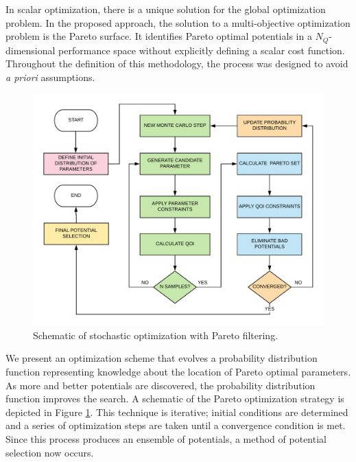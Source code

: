 In scalar optimization, there is a unique solution for the global optimization problem.   In the proposed approach, the solution to a multi-objective optimization problem is the Pareto surface.  It identifies Pareto optimal potentials in a $N_Q$-dimensional performance space without explicitly defining a scalar cost function.  Throughout the definition of this methodology, the process was designed to avoid \emph{a priori} assumptions.


\begin{figure}[ht]
	\centering
	\includegraphics{chapter5/img/pareto_optimization}
	\caption{Schematic of stochastic optimization with Pareto filtering.}
	\label{fig:pareto_optimization}
\end{figure}

We present an optimization scheme that evolves a probability distribution function representing knowledge about the location of Pareto optimal parameters.  As more and better potentials are discovered, the probability distribution function improves the search.  A schematic of the Pareto optimization strategy is depicted in Figure \ref{fig:pareto_optimization}.  This technique is iterative; initial conditions are determined and a series of optimization steps are taken until a convergence condition is met.  Since this process produces an ensemble of potentials, a method of potential selection now occurs.

